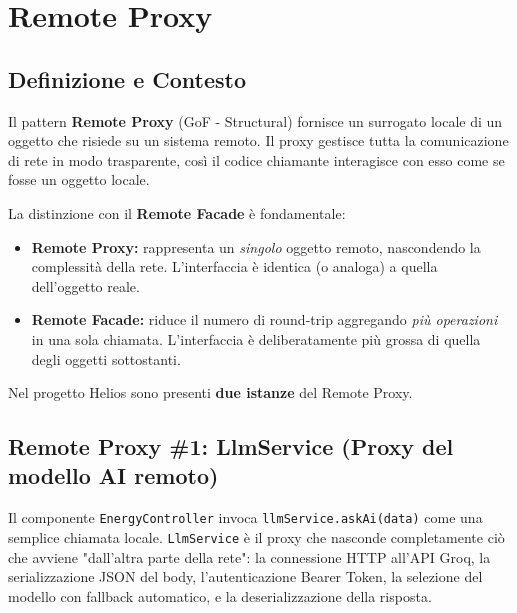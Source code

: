 \documentclass[a4paper,12pt]{report}
\begin{document}
\section{Remote Proxy}

\subsection{Definizione e Contesto}
Il pattern \textbf{Remote Proxy} (GoF - Structural) fornisce un surrogato locale di un oggetto che risiede su un sistema remoto. Il proxy gestisce tutta la comunicazione di rete in modo trasparente, così il codice chiamante interagisce con esso come se fosse un oggetto locale.

La distinzione con il \textbf{Remote Facade} è fondamentale:
\begin{itemize}
    \item \textbf{Remote Proxy:} rappresenta un \textit{singolo} oggetto remoto, nascondendo la complessità della rete. L'interfaccia è identica (o analoga) a quella dell'oggetto reale.
    \item \textbf{Remote Facade:} riduce il numero di round-trip aggregando \textit{più operazioni} in una sola chiamata. L'interfaccia è deliberatamente più grossa di quella degli oggetti sottostanti.
\end{itemize}

Nel progetto Helios sono presenti \textbf{due istanze} del Remote Proxy.

\subsection{Remote Proxy \#1: LlmService (Proxy del modello AI remoto)}

Il componente \texttt{EnergyController} invoca \texttt{llmService.askAi(data)} come una semplice chiamata locale. \texttt{LlmService} è il proxy che nasconde completamente ciò che avviene "dall'altra parte della rete": la connessione HTTP all'API Groq, la serializzazione JSON del body, l'autenticazione Bearer Token, la selezione del modello con fallback automatico, e la deserializzazione della risposta.
\end{document}
